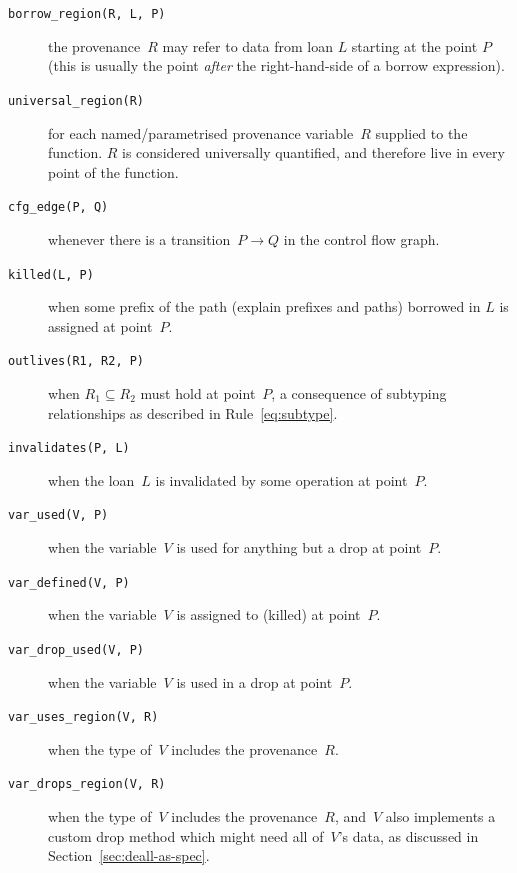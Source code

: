 \documentclass[11pt,a4paper,twoside,openany]{report}
\newcommand{\fixme}[1] {{\color{red}#1}}
\newcommand{\InDatalog}[1]{\texttt{#1}}
\begin{document}
\begin{description}
\item[\InDatalog{borrow_region(R, L, P)}] the provenance~$R$ may refer
  to data from loan $L$ starting at the point $P$ (this is usually the point
  \emph{after} the right-hand-side of a borrow expression).
  
\item[\InDatalog{universal_region(R)}] for each named/parametrised provenance
  variable~$R$ supplied to the function. $R$ is considered universally
  quantified, and therefore live in every point of the function.
  
\item[\InDatalog{cfg_edge(P, Q)}] whenever there is a transition~$P \rightarrow
  Q$ in the control flow graph.
    
\item[\InDatalog{killed(L, P)}] when some prefix of the path (\fixme{explain
    prefixes and paths}) borrowed in $L$ is assigned at point~$P$.
    
\item[\InDatalog{outlives(R1, R2, P)}] when $R_1 \subseteq R_2$ must hold at
  point~$P$, a consequence of subtyping relationships as described in
  Rule~\eqref{eq:subtype}.
    
\item[\InDatalog{invalidates(P, L)}] when the loan~$L$ is invalidated by some
  operation at point~$P$.
    
\item[\InDatalog{var_used(V, P)}] when the variable~$V$ is used for anything but
  a drop at point~$P$.
    
\item[\InDatalog{var_defined(V, P)}] when the variable~$V$ is assigned to
  (killed) at point~$P$.
  
\item[\InDatalog{var_drop_used(V, P)}] when the variable~$V$ is used in a drop at point~$P$.

\item[\InDatalog{var_uses_region(V, R)}] when the type of~$V$ includes the
  provenance~$R$.

\item[\InDatalog{var_drops_region(V, R)}] when the type of~$V$ includes the
  provenance~$R$, and~$V$ also implements a custom drop method which might need
  all of~$V$'s data, as discussed in Section~\ref{sec:deall-as-spec}.
\end{description}
\end{document}
